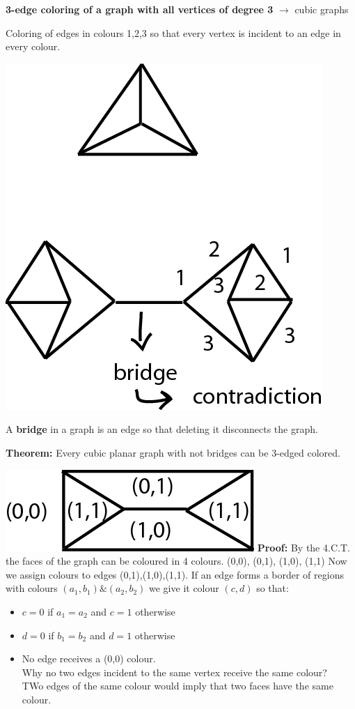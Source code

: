 \documentclass[9pt, letterpaper, oneside]{article}
\begin{document}
\textbf{3-edge coloring of a graph with all vertices of degree 3} $\to$ cubic graphs 

Coloring of edges in colours 1,2,3 so that every vertex is incident to an edge in every colour.

\includegraphics{fig42.png}

A \textbf{bridge} in a graph is an edge so that deleting it disconnects the graph.

\textbf{Theorem:} Every cubic planar graph with not bridges can be 3-edged colored.

\includegraphics{fig43.png}
\textbf{Proof:} By the 4.C.T. the faces of the graph can be coloured in 4 colours. (0,0), (0,1), (1,0), (1,1)
Now we assign colours to edges (0,1),(1,0),(1,1). If an edge forms a border of regions with colours $(a_1, b_1) \& (a_2, b_2)$ we give it colour $(c,d)$ so that:
\begin{itemize}
    \item $c = 0$ if $a_1 = a_2$ and $c= 1$ otherwise
    \item $d = 0$ if $b_1 = b_2$ and $d = 1$ otherwise
    \item No edge receives a (0,0) colour.\\
    Why no two edges incident to the same vertex receive the same colour?\\
    TWo edges of the same colour would imply that two faces have the same colour.
\end{itemize}
\end{document}
